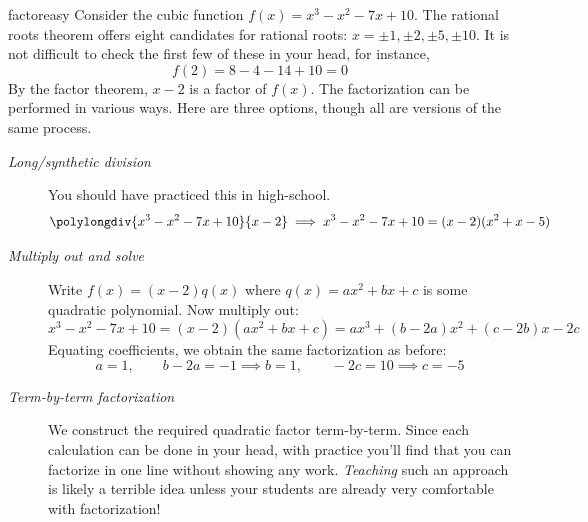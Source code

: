 \begin{example}{}{factoreasy}
	Consider the cubic function $f(x)=x^3-x^2-7x+10$. The rational roots theorem offers eight candidates for rational roots: $x=\pm 1,\pm 2,\pm 5,\pm 10$. It is not difficult to check the first few of these in your head, for instance,
	\[
		f(2)=8-4-14+10=0
	\]
	By the factor theorem, $x-2$ is a factor of $f(x)$. The factorization can be performed in various ways. Here are three options, though all are versions of the same process.
	\begin{description}
		\item[\normalfont\emph{Long/synthetic division}]\lstsp You should have practiced this in high-school.
	  \[
	  	\polylongdiv{x^3-x^2-7x+10}{x-2} \implies x^3-x^2-7x+10=(x-2)(x^2+x-5)
	  \]
	  \item[\normalfont\emph{Multiply out and solve}]\lstsp Write $f(x)=(x-2)q(x)$ where $q(x)=ax^2+bx+c$ is some quadratic polynomial. Now multiply out:
	  \[
	  	x^3-x^2-7x+10=(x-2)(ax^2+bx+c) =ax^3+(b-2a)x^2+(c-2b)x-2c
	  \]
	  Equating coefficients, we obtain the same factorization as before:
	  \[
	  	a=1,\qquad b-2a=-1\implies b=1,\qquad -2c=10\implies c=-5
	  \]
	  \item[\normalfont\emph{Term-by-term factorization}]\lstsp We construct the required quadratic factor term-by-term. Since each calculation can be done in your head, with practice you'll find that you can factorize in one line without showing any work. \emph{Teaching} such an approach is likely a terrible idea unless your students are already very comfortable with factorization!
	\end{description}
	

\end{example}

